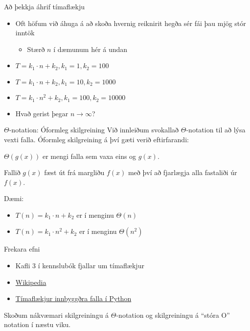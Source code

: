 \documentclass{beamer}
\begin{document}
\begin{frame}{Að þekkja áhrif tímaflækju}
\begin{itemize}
 \item Oft höfum við áhuga á að skoða hvernig reiknirit hegða sér fái þau mjög stór inntök
 \begin{itemize}
  \item Stærð $n$ í dæmunum hér á undan
 \end{itemize}
 \item $T = k_1\cdot n + k_2, k_1 = 1, k_2 = 100$
 \item $T = k_1\cdot n + k_2, k_1 = 10, k_2 = 1000$
 \item $T = k_1\cdot n^2 + k_2, k_1 = 100, k_2 = 10000$
 \item Hvað gerist þegar $n \to \infty$?
\end{itemize}
\end{frame}

\begin{frame}{$\Theta$-notation: Óformleg skilgreining}
Við innleiðum svokallað $\Theta$-notation til að lýsa vexti falla. Óformleg skilgreining á því gæti verið eftirfarandi:

\begin{center}
$\Theta(g(x))$ er mengi falla sem vaxa eins og $g(x)$.
\end{center}

\begin{center}
Fallið $g(x)$ fæst út frá margliðu $f(x)$ með því að fjarlægja alla fastaliði úr $f(x)$.
\end{center}
Dæmi: 
\begin{itemize}
 \item $T(n) = k_1\cdot n + k_2$ er í menginu $\Theta(n)$
 \item $T(n) = k_1\cdot n^2 + k_2$ er í menginu $\Theta(n^2)$
\end{itemize}
\end{frame}

\begin{frame}{Frekara efni}
\begin{itemize}
 \item Kafli 3 í kennslubók fjallar um tímaflækjur
 \item \href{http://en.wikipedia.org/wiki/Time_complexity}{Wikipedia}
 \item \href{https://wiki.python.org/moin/TimeComplexity}{Tímaflækjur innbyggðra falla í Python}
\end{itemize}
Skoðum nákvæmari skilgreiningu á $\Theta$-notation og skilgreiningu á ``stóra O'' notation í næstu viku.
\end{frame}
\end{document}
